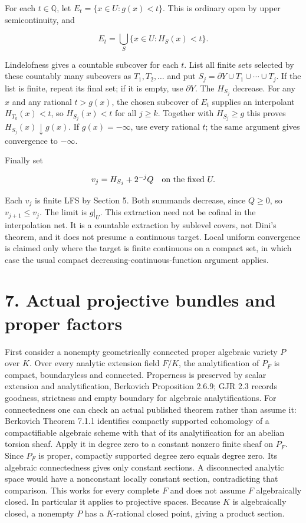 \documentclass[11pt]{article}
\begin{document}
For each $t\in\mathbb Q$, let $E_t=\{x\in U:g(x)<t\}$. This is ordinary open by upper semicontinuity, and

\[E_t=\bigcup_S\{x\in U:H_S(x)<t\}.\]

Lindelofness gives a countable subcover for each $t$. List all finite sets selected by these countably many subcovers as $T_1,T_2,\ldots$ and put $S_j=\partial Y\cup T_1\cup\cdots\cup T_j$. If the list is finite, repeat its final set; if it is empty, use $\partial Y$. The $H_{S_j}$ decrease. For any $x$ and any rational $t>g(x)$, the chosen subcover of $E_t$ supplies an interpolant $H_{T_k}(x)<t$, so $H_{S_j}(x)<t$ for all $j\geq k$. Together with $H_{S_j}\geq g$ this proves $H_{S_j}(x)\downarrow g(x)$. If $g(x)=-\infty$, use every rational $t$; the same argument gives convergence to $-\infty$.

Finally set

\[v_j=H_{S_j}+2^{-j}Q\quad\hbox{on the fixed }U.\]

Each $v_j$ is finite LFS by Section 5. Both summands decrease, since $Q\geq0$, so $v_{j+1}\leq v_j$. The limit is $g|_U$. This extraction need not be cofinal in the interpolation net. It is a countable extraction by sublevel covers, not Dini's theorem, and it does not presume a continuous target. Local uniform convergence is claimed only where the target is finite continuous on a compact set, in which case the usual compact decreasing-continuous-function argument applies.

\section*{7. Actual projective bundles and proper factors}

First consider a nonempty geometrically connected proper algebraic variety $P$ over $K$. Over every analytic extension field $F/K$, the analytification of $P_F$ is compact, boundaryless and connected. Properness is preserved by scalar extension and analytification, Berkovich Proposition 2.6.9; GJR 2.3 records goodness, strictness and empty boundary for algebraic analytifications. For connectedness one can check an actual published theorem rather than assume it: Berkovich Theorem 7.1.1 identifies compactly supported cohomology of a compactifiable algebraic scheme with that of its analytification for an abelian torsion sheaf. Apply it in degree zero to a constant nonzero finite sheaf on $P_F$. Since $P_F$ is proper, compactly supported degree zero equals degree zero. Its algebraic connectedness gives only constant sections. A disconnected analytic space would have a nonconstant locally constant section, contradicting that comparison. This works for every complete $F$ and does not assume $F$ algebraically closed. In particular it applies to projective spaces. Because $K$ is algebraically closed, a nonempty $P$ has a $K$-rational closed point, giving a product section.
\end{document}
